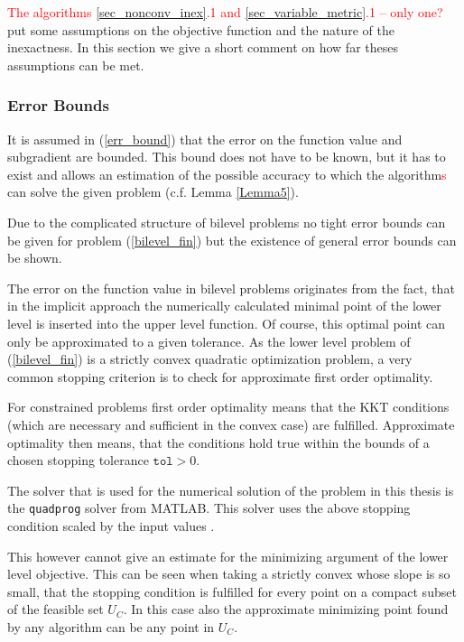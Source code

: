\textcolor{red}{The algorithms \ref{sec_nonconv_inex}.1 and \ref{sec_variable_metric}.1 -- only one? } put some assumptions on the objective function and the nature of the inexactness. In this section we give a short comment on how far theses assumptions can be met.


\subsubsection{Error Bounds}

It is assumed in (\ref{err_bound}) that the error on the function value and subgradient are bounded. This bound does not have to be known, but it has to exist and allows an estimation of the possible accuracy to which the algorithm\textcolor{red}{s} can solve the given problem (c.f. Lemma \ref{Lemma5}).

Due to the complicated structure of bilevel problems no tight error bounds can be given for problem (\ref{bilevel_fin}) but the existence of general error bounds can be shown.


The error on the function value in bilevel problems originates from the fact, that in the implicit approach the numerically calculated minimal point of the lower level is inserted into the upper level function.
Of course, this optimal point can only be approximated to a given tolerance.
As the lower level problem of (\ref{bilevel_fin}) is a strictly convex quadratic optimization problem, a very common stopping criterion is to check for approximate first order optimality.

For constrained problems first order optimality means that the KKT conditions (which are necessary and sufficient in the convex case) are fulfilled.
Approximate optimality then means, that the conditions hold true within the bounds of a chosen stopping tolerance \(\mathtt{tol}
 >0\).

The solver that is used for the numerical solution of the problem in this thesis is the \texttt{quadprog} solver from MATLAB. This solver uses the above stopping condition scaled by the input values \cite{2017}.

This  however cannot give an estimate for the minimizing argument of the lower level objective.
This can be seen when taking a strictly convex whose slope is so small, that the stopping condition is fulfilled for every point on a compact subset of the feasible set \(U_C\).
In this case also the approximate minimizing point found by any algorithm can be any point in \(U_C\). 


